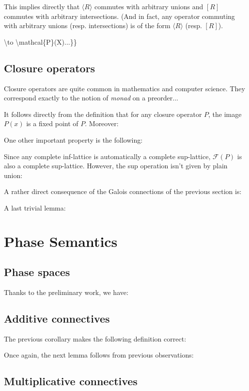 This implies directly that \(\langle R\rangle\) commutes with arbitrary
unions and \([R]\) commutes with arbitrary intersections. (And in fact,
any operator commuting with arbitrary unions (resp. intersections) is of
the form \(\langle R\rangle\) (resp. \([R]\)).

\textbackslash{}to \textbackslash{}mathcal\{P\}(X)...\}\}

\subsection{Closure operators}\label{closure-operators}

Closure operators are quite common in mathematics and computer science.
They correspond exactly to the notion of \emph{monad} on a preorder...

It follows directly from the definition that for any closure operator
\(P\), the image \(P(x)\) is a fixed point of \(P\). Moreover:

One other important property is the following:

Since any complete inf-lattice is automatically a complete sup-lattice,
\(\mathcal{F}(P)\) is also a complete sup-lattice. However, the sup
operation isn't given by plain union:

A rather direct consequence of the Galois connections of the previous
section is:

A last trivial lemma:

\section{Phase Semantics}\label{phase-semantics-1}

\subsection{Phase spaces}\label{phase-spaces}

Thanks to the preliminary work, we have:

\subsection{Additive connectives}\label{additive-connectives}

The previous corollary makes the following definition correct:

Once again, the next lemma follows from previous observations:

\subsection{Multiplicative
connectives}\label{multiplicative-connectives}

